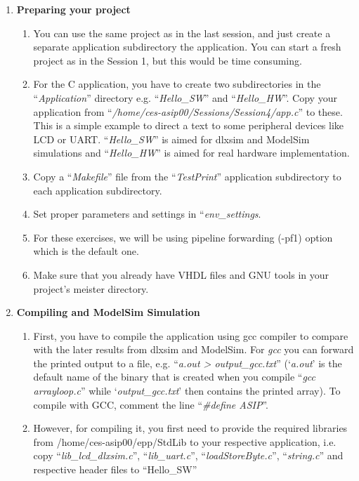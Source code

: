 \begin{enumerate}
\item \textbf{Preparing your project}
	\begin{enumerate}
		\item
		You can use the same project as in the last session, and just create
		a separate application subdirectory the application. You can start a
		fresh project as in the Session 1, but this would be time consuming.
		\item
		For the C application, you have to create two subdirectories in the
		``\emph{Application}'' directory e.g. ``\emph{Hello\_SW}'' and
		``\emph{Hello\_HW}''. Copy your application from
		``\emph{/home/ces-asip00/Sessions/Session4/app.c}'' to these. This is a
		simple example to direct a text to some peripheral devices like LCD
		or UART. ``\emph{Hello\_SW}'' is aimed for dlxsim and ModelSim
		simulations and ``\emph{Hello\_HW}'' is aimed for real hardware
		implementation.
		\item
		Copy a ``\emph{Makefile}'' file from the ``\emph{TestPrint}''
		application subdirectory to each application subdirectory.
		\item
		Set proper parameters and settings in ``\emph{env\_settings}.
		\item
		For these exercises, we will be using pipeline forwarding (-pf1)
		option which is the default one.
		\item
		Make sure that you already have VHDL files and GNU tools in your
		project's meister directory.
	\end{enumerate}
\item \textbf{Compiling and ModelSim Simulation}
	\begin{enumerate}
		\item
		First, you have to compile the application using gcc compiler to
		compare with the later results from dlxsim and ModelSim. For
		\emph{gcc} you can forward the printed output to a file, e.g.
		``\emph{a.out \textgreater{} output\_gcc.txt}'' (`\emph{a.out}' is
		the default name of the binary that is created when you compile
		``\emph{gcc arrayloop.c}'' while `\emph{output\_gcc.txt}' then
		contains the printed array). To compile with GCC, comment the line
		``\emph{\#define ASIP}''.
		\item
		However, for compiling it, you first need to provide the required
		libraries from /home/ces-asip00/epp/StdLib to your respective
		application, i.e. copy ``\emph{lib\_lcd\_dlxsim.c}'',
		``\emph{lib\_uart.c}'', ``\emph{loadStoreByte.c}'',
		``\emph{string.c}'' and respective header files to ``Hello\_SW''

\end{enumerate}
\end{enumerate}
